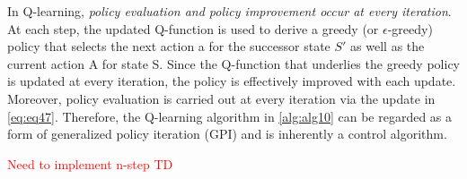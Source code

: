 \documentclass[
	10pt, %
]{article}
\theoremstyle{plain}
\newcommand{\ti}[1]{\textit{#1}}
\numberwithin{equation}{subsection} %
\begin{document}
In Q-learning, \ti{policy evaluation and policy improvement occur at every iteration}. 
At each step, the updated Q-function is used to derive a greedy (or $\epsilon$-greedy) policy that selects the next action a for the successor state $S'$ as well as the current action A for state S. 
Since the Q-function that underlies the greedy policy is updated at every iteration, the policy is effectively improved with each update. 
Moreover, policy evaluation is carried out at every iteration via the update in \cref{eq:eq47}.
Therefore, the Q-learning algorithm in \cref{alg:alg10} can be regarded as a form of generalized policy iteration (GPI) and is inherently a control algorithm.

\textcolor{red}{Need to implement n-step TD}
\end{document}
